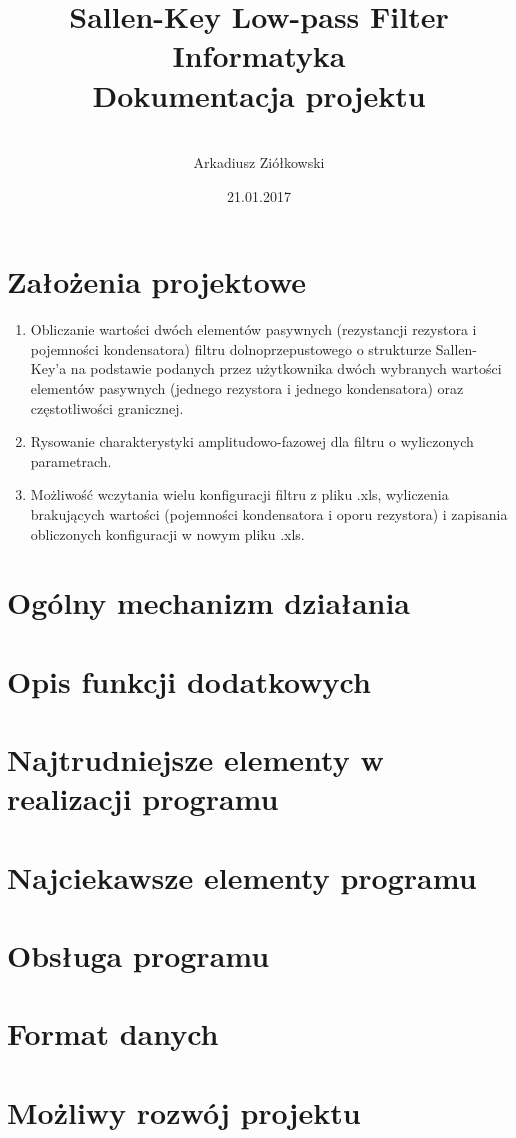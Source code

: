 \documentclass[a4paper,12pt]{article}
\title{\Huge \textbf{Sallen-Key Low-pass Filter\\[0.3in]} 
  \huge Informatyka \\[0.2in]
  \LARGE Dokumentacja projektu
}
\date{21.01.2017}
\author{
 	\quad	\\
  Arkadiusz Ziółkowski\\
}
\begin{document}
\maketitle
\pagebreak

\tableofcontents
\pagebreak


\section{Założenia projektowe}

	\begin{enumerate}
		\item Obliczanie wartości dwóch elementów pasywnych (rezystancji rezystora i 
		pojemności kondensatora) filtru dolnoprzepustowego o strukturze Sallen-Key'a
		na podstawie podanych przez użytkownika dwóch wybranych wartości elementów 
		pasywnych (jednego rezystora i jednego kondensatora) oraz częstotliwości
		granicznej.
		\item Rysowanie charakterystyki amplitudowo-fazowej dla filtru o wyliczonych
		 parametrach.
		\item Możliwość wczytania wielu konfiguracji filtru z pliku .xls, wyliczenia 
		brakujących wartości (pojemności kondensatora i oporu rezystora) i zapisania
		obliczonych konfiguracji w nowym pliku .xls.
	\end{enumerate}

\section{Ogólny mechanizm działania}

	

\section{Opis funkcji dodatkowych}
\section{Najtrudniejsze elementy w realizacji programu}
\section{Najciekawsze elementy programu}
\section{Obsługa programu}
\section{Format danych}
\section{Możliwy rozwój projektu}
\end{document}
